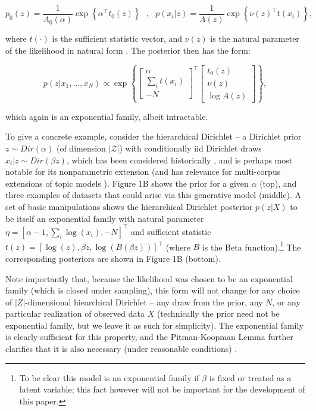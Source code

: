 \documentclass{article}
\begin{document}
$$ p_0(z) = \frac{1}{A_0(\alpha)} \exp\left\{ \alpha^\top t_0(z) \right \} ~~~ , ~~~ p(x_i|z) = \frac{1}{A(z)} \exp\left\{ \nu(z)^\top t(x_i) \right \},$$

where $t(\cdot)$ is the sufficient statistic vector, and $\nu(z)$ is the natural parameter of the likelihood in natural form \cite{robert2007bayesian}.   The posterior then has the form:

$$  p(z | x_1,...,x_N)  \propto  \exp\left\{ \begin{bmatrix} \alpha \\ \sum_i t(x_i) \\ -N \end{bmatrix}^\top\begin{bmatrix} t_0(z) \\ \nu(z) \\ \log A(z) \end{bmatrix} \right\},$$

which again is an exponential family, albeit intractable.

To give a concrete example, consider the hierarchical Dirichlet -- a Dirichlet prior $z\sim Dir(\alpha)$ (of dimension $|\mathcal{Z}|$) with conditionally iid Dirichlet draws $x_i | z \sim Dir(\beta z)$, which has been considered historically \cite{mackay1995hierarchical}, and is perhaps most notable for its nonparametric extension \cite{teh2006hdp} (and has relevance for multi-corpus extensions of topic models \cite{blei2003latent, pritchard2000inference}).  
Figure 1B shows the prior for a given $\alpha$ (top), and three examples of datasets that could arise via this generative model (middle).  
A set of basic manipulations shows the hierarchical Dirichlet posterior $p(z|X)$ to be itself an exponential family with natural parameter $\eta = \left[ \alpha -1 , \sum_i \log(x_i) , -N \right]^\top$ and sufficient statistic $t(z) = \left[ \log(z), \beta z , \log(B(\beta z)) \right]^\top$ (where $B$ is the Beta function).\footnote{To be clear this model is an exponential family if $\beta$ is fixed or treated as a latent variable; this fact however will not be important for the development of this paper.}
The corresponding posteriors are shown in Figure 1B (bottom).  

Note importantly that, because the likelihood was chosen to be an exponential family (which is closed under sampling), this form will not change for any choice of $|Z|$-dimensional hiearchical Dirichlet -- any draw from the prior, any $N$, or any particular realization of observed data $X$ (technically the prior need not be exponential family, but we leave it as such for simplicity).  
The exponential family is clearly sufficient for this property, and the Pitman-Koopman Lemma further clarifies that it is also necessary (under reasonable conditions) \cite[\S3.3.3]{robert2007bayesian}.
\end{document}
